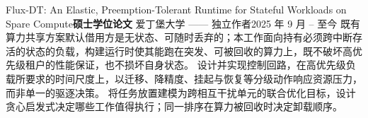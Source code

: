     \resumeSubheading
      {Flux-DT: An Elastic, Preemption-Tolerant Runtime for Stateful Workloads on Spare Compute}{\textbf{硕士学位论文}}
      {爱丁堡大学 —— 独立作者}{2025 年 9 月 -- 至今}
      \resumeItemListStart
          {既有算力共享方案默认借用方是无状态、可随时丢弃的；本工作面向持有必须跨中断存活的状态的负载，构建运行时使其能跑在突发、可被回收的算力上，既不破坏高优先级租户的性能保证，也不损坏自身状态。}
          {设计并实现控制回路，在高优先级负载所要求的时间尺度上，以迁移、降精度、挂起与恢复等分级动作响应资源压力，而非单一的驱逐决策。}
          {将任务放置建模为跨相互干扰单元的联合优化目标，设计贪心启发式决定哪些工作值得执行；同一排序在算力被回收时决定卸载顺序。}
      \resumeItemListEnd
